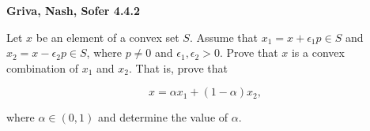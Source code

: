 \textbf{Griva, Nash, Sofer 4.4.2}

Let $x$ be an element of a convex set $S$. Assume that $x_1 = x + \epsilon_1 p \in S$ \linebreak 
and $x_2 = x - \epsilon_2 p \in S$, where $p \neq 0$ and $\epsilon_1, \epsilon_2 > 0$. Prove that $x$ is a convex 
combination of $x_1$ and $x_2$. That is, prove that

$$
x = \alpha x_1 + (1 - \alpha) x_2,
$$

where $\alpha \in (0, 1)$ and determine the value of $\alpha$.

\begin{solution}
  \ \\
\end{solution}